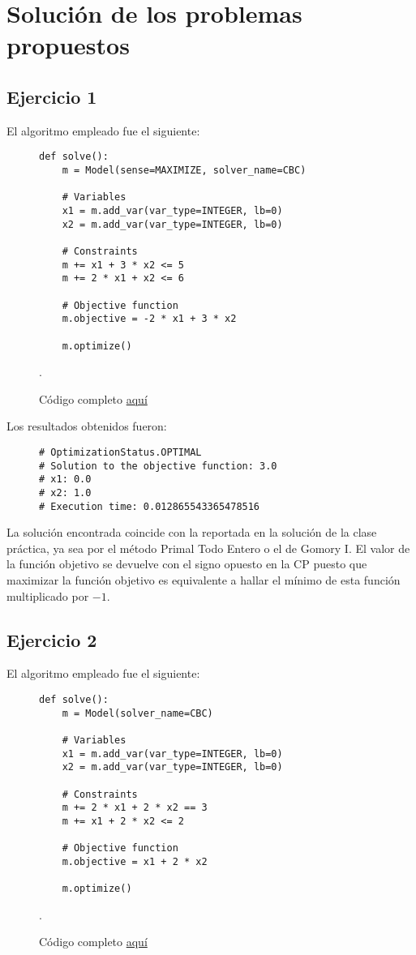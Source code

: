 \documentclass[titlepage, 11pt]{scrartcl}
\begin{document}
	\section{Solución de los problemas propuestos}
	\subsection{Ejercicio 1}
	 El algoritmo empleado fue el siguiente:
	\begin{figure}[H]
		\begin{verbatim}
def solve():
	m = Model(sense=MAXIMIZE, solver_name=CBC)
	
	# Variables
	x1 = m.add_var(var_type=INTEGER, lb=0)
	x2 = m.add_var(var_type=INTEGER, lb=0)
	
	# Constraints
	m += x1 + 3 * x2 <= 5
	m += 2 * x1 + x2 <= 6
	
	# Objective function
	m.objective = -2 * x1 + 3 * x2
	
	m.optimize()
		\end{verbatim}
		\caption{Código completo \href{ex1.py}{aquí}}.
	\end{figure}

		 Los resultados obtenidos fueron:
	\begin{figure}[H]
		\begin{verbatim}
# OptimizationStatus.OPTIMAL
# Solution to the objective function: 3.0
# x1: 0.0
# x2: 1.0
# Execution time: 0.012865543365478516
		\end{verbatim}
	\end{figure}

La solución encontrada coincide con la reportada en la solución de la clase práctica, ya sea por el método Primal Todo Entero o el de Gomory I. El valor de la función objetivo se devuelve con el signo opuesto en la CP puesto que maximizar la función objetivo es equivalente a hallar el mínimo de esta función multiplicado por $-1$.

	\subsection{Ejercicio 2}
El algoritmo empleado fue el siguiente:
\begin{figure}[H]
	\begin{verbatim}
def solve():
	m = Model(solver_name=CBC)
	
	# Variables
	x1 = m.add_var(var_type=INTEGER, lb=0)
	x2 = m.add_var(var_type=INTEGER, lb=0)
	
	# Constraints
	m += 2 * x1 + 2 * x2 == 3
	m += x1 + 2 * x2 <= 2
	
	# Objective function
	m.objective = x1 + 2 * x2
	
	m.optimize()
	\end{verbatim}
	\caption{Código completo \href{ex2.py}{aquí}}.
\end{figure}
\end{document}
